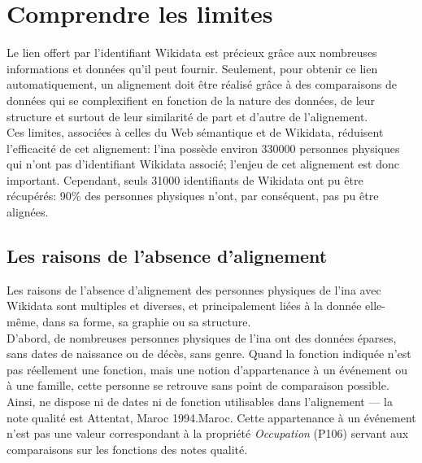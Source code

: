 \section{\label{II-C-4}Comprendre les limites}

Le lien offert par l'identifiant Wikidata est précieux grâce aux nombreuses informations et données qu'il peut fournir. Seulement,  pour obtenir ce lien automatiquement, un alignement doit être réalisé grâce à des comparaisons de données qui se complexifient en fonction de la nature des données, de leur structure et surtout de leur similarité de part et d'autre de l'alignement.\\

Ces limites, associées à celles du Web sémantique et de Wikidata, réduisent  l'efficacité de cet alignement: l'\ac{ina} possède environ 330000 personnes physiques qui n'ont pas d'identifiant Wikidata associé; l'enjeu de cet alignement est donc important. Cependant, seuls 31000 identifiants de Wikidata ont pu être récupérés: 90\% des personnes physiques n'ont, par conséquent, pas pu être alignées. 

\subsection{\label{II-C-4-a}Les raisons de l'absence d'alignement}

Les raisons de l'absence d'alignement des personnes physiques de l'\ac{ina} avec Wikidata sont multiples et diverses, et principalement liées à la donnée elle-même, dans sa forme, sa graphie ou sa structure.\\

D'abord, de nombreuses personnes physiques de l'\ac{ina} ont des données éparses, sans dates de naissance ou de décès, sans genre. Quand la fonction indiquée n'est pas réellement une fonction, mais une notion d'appartenance à un événement ou à une famille, cette personne se retrouve sans point de comparaison possible. Ainsi,  ne dispose ni de dates ni de fonction utilisables dans l'alignement --- la note qualité est \og Attentat, Maroc 1994.Maroc\fg{}. Cette appartenance à un événement n'est pas une valeur correspondant à la propriété \textit{Occupation} (P106) servant aux comparaisons sur les fonctions des notes qualité.\\

